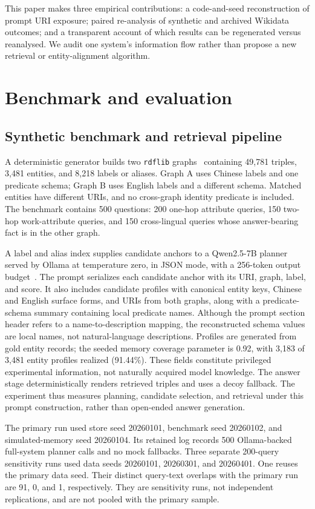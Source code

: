 \documentclass[a4paper,fleqn]{cas-dc}
\begin{document}
This paper makes three empirical contributions: a code-and-seed reconstruction of prompt URI exposure; paired re-analysis of synthetic and archived Wikidata outcomes; and a transparent account of which results can be regenerated versus reanalysed. We audit one system's information flow rather than propose a new retrieval or entity-alignment algorithm.

\section{Benchmark and evaluation}\label{sec:method}
\subsection{Synthetic benchmark and retrieval pipeline}
A deterministic generator builds two \texttt{rdflib} graphs~\cite{rdflib} containing 49,781 triples, 3,481 entities, and 8,218 labels or aliases. Graph A uses Chinese labels and one predicate schema; Graph B uses English labels and a different schema. Matched entities have different URIs, and no cross-graph identity predicate is included. The benchmark contains 500 questions: 200 one-hop attribute queries, 150 two-hop work-attribute queries, and 150 cross-lingual queries whose answer-bearing fact is in the other graph.

A label and alias index supplies candidate anchors to a Qwen2.5-7B planner served by Ollama at temperature zero, in JSON mode, with a 256-token output budget~\cite{qwen25}. The prompt serializes each candidate anchor with its URI, graph, label, and score. It also includes candidate profiles with canonical entity keys, Chinese and English surface forms, and URIs from both graphs, along with a predicate-schema summary containing local predicate names. Although the prompt section header refers to a name-to-description mapping, the reconstructed schema values are local names, not natural-language descriptions. Profiles are generated from gold entity records; the seeded memory coverage parameter is 0.92, with 3,183 of 3,481 entity profiles realized (91.44\%). These fields constitute privileged experimental information, not naturally acquired model knowledge. The answer stage deterministically renders retrieved triples and uses a decoy fallback. The experiment thus measures planning, candidate selection, and retrieval under this prompt construction, rather than open-ended answer generation.

The primary run used store seed 20260101, benchmark seed 20260102, and simulated-memory seed 20260104. Its retained log records 500 Ollama-backed full-system planner calls and no mock fallbacks. Three separate 200-query sensitivity runs used data seeds 20260101, 20260301, and 20260401. One reuses the primary data seed. Their distinct query-text overlaps with the primary run are 91, 0, and 1, respectively. They are sensitivity runs, not independent replications, and are not pooled with the primary sample.
\end{document}
